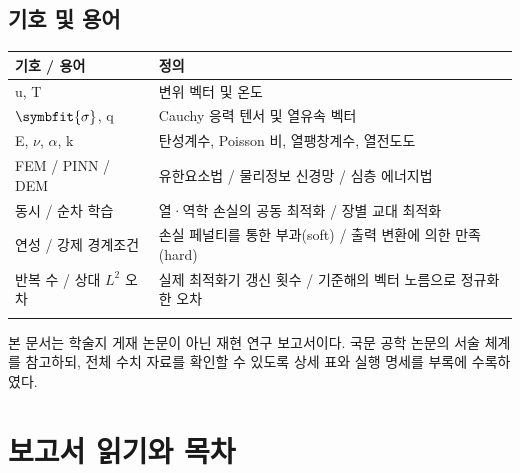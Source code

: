 \documentclass[10pt,a4paper]{article}
\renewcommand{\boldsymbol}[1]{\symbfit{#1}}
\begin{document}
\subsection{기호 및 용어}

\begingroup\small

\par\begin{minipage}{\linewidth}\begin{tabular}{>{\raggedright\arraybackslash}p{}>{\raggedright\arraybackslash}p{}}

\rowcolor{tint} \textbf{기호 / 용어} & \textbf{정의}\\\midrule

u, T & 변위 벡터 및 온도\\\addlinespace[2pt]

$\boldsymbol{\sigma}$, q & Cauchy 응력 텐서 및 열유속 벡터\\\addlinespace[2pt]

E, $\nu$, $\alpha$, k & 탄성계수, Poisson 비, 열팽창계수, 열전도도\\\addlinespace[2pt]

FEM / PINN / DEM & 유한요소법 / 물리정보 신경망 / 심층 에너지법\\\addlinespace[2pt]

동시 / 순차 학습 & 열·역학 손실의 공동 최적화 / 장별 교대 최적화\\\addlinespace[2pt]

연성 / 강제 경계조건 & 손실 페널티를 통한 부과(soft) / 출력 변환에 의한 만족(hard)\\\addlinespace[2pt]

반복 수 / 상대 $L^2$ 오차 & 실제 최적화기 갱신 횟수 / 기준해의 벡터 노름으로 정규화한 오차\\\addlinespace[2pt]

\bottomrule\end{tabular}\end{minipage}\par\vspace{5pt}\endgroup

{\small\color{muted} 본 문서는 학술지 게재 논문이 아닌 재현 연구 보고서이다. 국문 공학 논문의 서술 체계를 참고하되, 전체 수치 자료를 확인할 수 있도록 상세 표와 실행 명세를 부록에 수록하였다.\par}

\clearpage

\section*{보고서 읽기와 목차}
\end{document}
